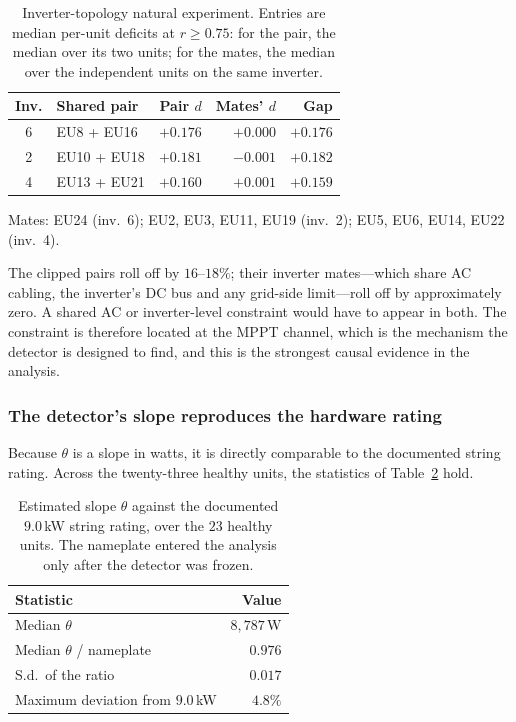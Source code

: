 \begin{table}[!t]
  \renewcommand{\arraystretch}{1.3}
  \centering
  \caption{Inverter-topology natural experiment. Entries are median per-unit
deficits at $r \ge 0.75$: for the pair, the median over its two units; for the mates, the median over the independent units on the same inverter.}
  \label{tab:mppt_inverter}
  \small
  \setlength{\tabcolsep}{5pt}
  \begin{tabular}{@{}clrrr@{}}
    \toprule
    Inv. & Shared pair & Pair $d$ & Mates' $d$ & Gap \\
    \midrule
    6 & EU8 + EU16   & $+0.176$ & $+0.000$ & $+0.176$ \\
    2 & EU10 + EU18  & $+0.181$ & $-0.001$ & $+0.182$ \\
    4 & EU13 + EU21  & $+0.160$ & $+0.001$ & $+0.159$ \\
    \bottomrule
  \end{tabular}
  \par\smallskip
  \parbox{\columnwidth}{\footnotesize Mates: EU24 (inv.~6); EU2, EU3, EU11,
EU19 (inv.~2); EU5, EU6, EU14, EU22 (inv.~4).}
\end{table}

The clipped pairs roll off by $16$--$18\%$; their inverter mates---which share AC cabling, the inverter's DC bus and any grid-side limit---roll off by approximately zero. A shared AC or inverter-level constraint would have to appear in both. The constraint is therefore located at the MPPT channel, which is the mechanism the detector is designed to find, and this is the strongest causal evidence in the analysis.

\subsubsection{The detector's slope reproduces the hardware rating}
\label{sss:mppt_nameplate}

Because $\theta$ is a slope in watts, it is directly comparable to the documented string rating. Across the twenty-three healthy units, the statistics of Table~\ref{tab:mppt_nameplate} hold.

\begin{table}[!t]
  \renewcommand{\arraystretch}{1.3}
  \centering
  \caption{Estimated slope $\theta$ against the documented $9.0$\,kW string
rating, over the $23$ healthy units. The nameplate entered the analysis only after the detector was frozen.}
  \label{tab:mppt_nameplate}
  \small
  \setlength{\tabcolsep}{5pt}
  \begin{tabular}{@{}lr@{}}
    \toprule
    Statistic & Value \\
    \midrule
    Median $\theta$ & $8{,}787$\,W \\
    Median $\theta$ / nameplate & $0.976$ \\
    S.d.\ of the ratio & $0.017$ \\
    Maximum deviation from $9.0$\,kW & $4.8\%$ \\
    \bottomrule
  \end{tabular}
\end{table}

